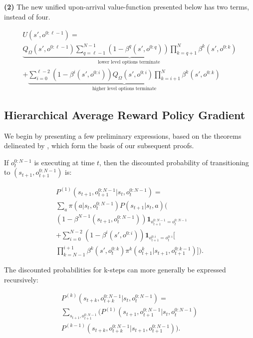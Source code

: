 \documentclass[letterpaper]{article} %
\begin{document}
\textbf{(2)} The new unified upon-arrival value-function presented below has two terms, instead of four.


\begin{align*}
U(s',o^{0:\ell-1}) =\\ \underbrace{Q_\Omega(s',o^{0:\ell-1}) \sum_{q=\ell-1}^{N-1}(1-\beta^{q}(s',o^{0:q}))  \prod_{k=q+1}^{N} \beta^k(s',o^{0:k}) }_{\text{lower level options terminate }}\\
+ \underbrace{ \sum_{i=0}^{\ell-2}(1-  \beta^i(s',o^{0:i})) Q_\Omega(s',o^{0:i}) \prod_{k=i+1}^{N} \beta^k(s',o^{0:k}) }_{\text{higher level options terminate}}
\end{align*}


\subsection{Hierarchical Average Reward Policy Gradient} \label{HOCPGProof}

We begin by presenting a few preliminary expressions, based on the theorems delineated by \cite{hoc}, which form the basis of our subsequent proofs. 

If $o_t^{0:N-1}$ is executing at time $t$, then the discounted probability of transitioning to $(s_{t+1},o_{t+1}^{0:N-1})$ is:

\begin{equation} 
\begin{split}
P^{(1)}(s_{t+1},o_{t+1}^{0:N-1}|s_t,o_t^{0:N-1}) =\\
\sum_a \pi(a|s_t,o_t^{0:N-1})  P(s_{t+1}|s_t,a) \bigg( \\ (1 - \beta^{N-1}(s_{t+1},o_t^{0:N-1}))\textbf{1}_{o_{t+1}^{0:N-1} =o_t^{0:N-1}} \\ +
\sum_{i=0}^{N - 2}(1-\beta^i(s',o^{0:i})) \textbf{1}_{o_{t+1}^{0:i}=o_t^{0:i}} \bigg[\\
\prod_{k=N-1}^{i+1} \beta^k(s',o_t^{0:k}) \pi^k(o_{t+1}^k|s_{t+1},o_{t+1}^{0:k-1}) \bigg] \bigg).
\end{split}
\end{equation}

The discounted probabilities for k-steps can more generally be expressed recursively: 

\begin{equation} 
\begin{split}
P^{(k)}(s_{t+k},o_{t+k}^{0:N-1}|s_t,o_{t}^{0:N-1}) = \\ \sum_{s_{t+1},o_{t+1}^{0:N-1}} \bigg( P^{(1)}(s_{t+1},o_{t+1}^{0:N-1}|s_t,o_{t}^{0:N-1}) \\ P^{(k-1)}(s_{t+k},o_{t+k}^{0:N-1}|s_{t+1},o_{t+1}^{0:N-1}) \bigg).
\end{split}
\end{equation}
\end{document}
